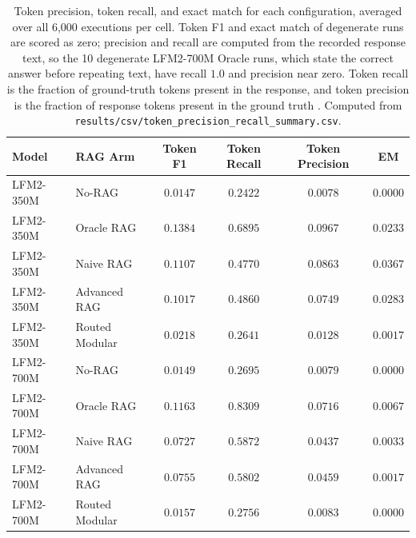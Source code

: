 \documentclass[10pt]{article}
\begin{document}
\begin{table}[t]
\centering
\caption{Token precision, token recall, and exact match for each configuration, averaged over all 6,000 executions per cell. Token F1 and exact match of degenerate runs are scored as zero; precision and recall are computed from the recorded response text, so the 10 degenerate LFM2-700M Oracle runs, which state the correct answer before repeating text, have recall $1.0$ and precision near zero. Token recall is the fraction of ground-truth tokens present in the response, and token precision is the fraction of response tokens present in the ground truth \citep{adlakha2024evaluating}. Computed from \texttt{results/csv/token\_precision\_recall\_summary.csv}.}
\label{tab:precision_recall}
\small
\begin{tabular}{llcccc}
\toprule
\textbf{Model} & \textbf{RAG Arm} & \textbf{Token F1} & \textbf{Token Recall} & \textbf{Token Precision} & \textbf{EM} \\
\midrule
LFM2-350M & No-RAG & $0.0147$ & $0.2422$ & $0.0078$ & $0.0000$ \\
LFM2-350M & Oracle RAG & $0.1384$ & $0.6895$ & $0.0967$ & $0.0233$ \\
LFM2-350M & Naive RAG & $0.1107$ & $0.4770$ & $0.0863$ & $0.0367$ \\
LFM2-350M & Advanced RAG & $0.1017$ & $0.4860$ & $0.0749$ & $0.0283$ \\
LFM2-350M & Routed Modular & $0.0218$ & $0.2641$ & $0.0128$ & $0.0017$ \\
\midrule
LFM2-700M & No-RAG & $0.0149$ & $0.2695$ & $0.0079$ & $0.0000$ \\
LFM2-700M & Oracle RAG & $0.1163$ & $0.8309$ & $0.0716$ & $0.0067$ \\
LFM2-700M & Naive RAG & $0.0727$ & $0.5872$ & $0.0437$ & $0.0033$ \\
LFM2-700M & Advanced RAG & $0.0755$ & $0.5802$ & $0.0459$ & $0.0017$ \\
LFM2-700M & Routed Modular & $0.0157$ & $0.2756$ & $0.0083$ & $0.0000$ \\
\bottomrule
\end{tabular}
\end{table}
\end{document}
